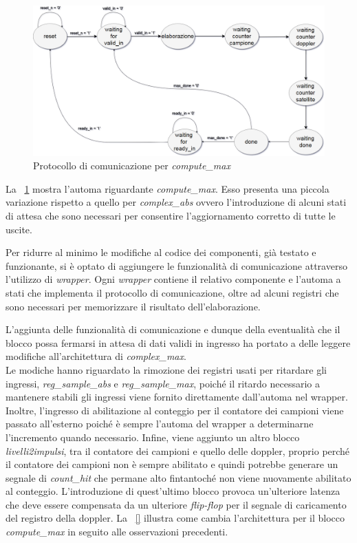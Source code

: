 \documentclass[12pt,a4paper,twoside,openany]{book}
\begin{document}
\clearpage
\begin{figure}
\begin{center}
\includegraphics[scale=0.31, keepaspectratio]{immagini/fsm_wrapper_max}
\caption{Protocollo di comunicazione per \textit{compute\_max}}
\label{wrappermax_fsm}
\end{center}
\end{figure}

La \figurename~\ref{wrappermax_fsm} mostra l'automa riguardante \textit{compute\_max}. Esso presenta una piccola variazione rispetto a quello per \textit{complex\_abs} ovvero l'introduzione di alcuni stati di attesa che sono necessari per consentire l'aggiornamento corretto di tutte le uscite.

Per ridurre al minimo le modifiche al codice dei componenti, già testato e funzionante, si è optato di aggiungere le funzionalità di comunicazione attraverso l'utilizzo di \textit{wrapper}. Ogni \textit{wrapper} contiene il relativo componente e l'automa a stati che implementa il protocollo di comunicazione, oltre ad alcuni registri che sono necessari per memorizzare il risultato dell'elaborazione.

L'aggiunta delle funzionalità di comunicazione e dunque della eventualità che il blocco possa fermarsi in attesa di dati validi in ingresso ha portato a delle leggere modifiche all'architettura di \textit{complex\_max}.\\
Le modiche hanno riguardato la rimozione dei registri usati per ritardare gli ingressi, \textit{reg\_sample\_abs} e \textit{reg\_sample\_max}, poiché il ritardo necessario a mantenere stabili gli ingressi viene fornito direttamente dall'automa nel wrapper. Inoltre, l'ingresso di abilitazione al conteggio per il contatore dei campioni viene passato all'esterno poiché è sempre l'automa del wrapper a determinarne l'incremento quando necessario. Infine, viene aggiunto un altro blocco \textit{livelli2impulsi}, tra il contatore dei campioni e quello delle doppler, proprio perché il contatore dei campioni non è sempre abilitato e quindi potrebbe generare un segnale di \textit{count\_hit} che permane alto fintantoché non viene nuovamente abilitato al conteggio. L'introduzione di quest'ultimo blocco provoca un'ulteriore latenza che deve essere compensata da un ulteriore \textit{flip-flop} per il segnale di caricamento del registro della doppler. La \figurename~\ref{} illustra come cambia l'architettura per il blocco \textit{compute\_max} in seguito alle osservazioni precedenti.
\end{document}
